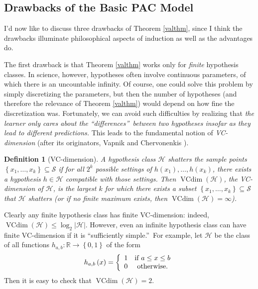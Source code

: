 \documentclass[12pt,onecolumn]{article}%
\newtheorem{definition}[theorem]{Definition}
\begin{document}
\subsection{Drawbacks of the Basic PAC Model\label{DRAWBACKS}}

I'd now like to discuss three drawbacks of Theorem \ref{valthm}, since I think
the drawbacks illuminate philosophical aspects of induction as well as the
advantages do.

The first drawback is that Theorem \ref{valthm} works only for \textit{finite}
hypothesis classes. In science, however, hypotheses often involve continuous
parameters, of which there is an uncountable infinity. Of course, one could
solve this problem by simply discretizing the parameters, but then the number
of hypotheses (and therefore the relevance of Theorem \ref{valthm}) would
depend on how fine the discretization was. Fortunately, we can avoid such
difficulties by realizing that \textit{the learner only cares about the
\textquotedblleft differences\textquotedblright\  between two hypotheses
insofar as they lead to different predictions.} This leads to the
fundamental notion of \textit{VC-dimension} (after its originators, Vapnik and
Chervonenkis \cite{vc}).

\begin{definition}
[VC-dimension]A hypothesis class $\mathcal{H}$ shatters the sample points
$\left\{  x_{1},\ldots,x_{k}\right\}  \subseteq\mathcal{S}$ if for all
$2^{k}$ possible settings of $h\left(  x_{1}\right)  ,\ldots,h\left(
x_{k}\right)  $, there exists a hypothesis $h\in\mathcal{H}$ compatible with
those settings. Then $\operatorname*{VCdim}\left(  \mathcal{H}\right)  $,
the VC-dimension of $\mathcal{H}$, is the largest $k$ for which there exists a
subset $\left\{  x_{1},\ldots,x_{k}\right\}  \subseteq\mathcal{S}$ that
$\mathcal{H}$ shatters (or if no finite maximum exists, then
$\operatorname*{VCdim}\left(  \mathcal{H}\right)  =\infty$).
\end{definition}

Clearly any finite hypothesis class has finite VC-dimension: indeed,
$\operatorname*{VCdim}\left(  \mathcal{H}\right)  \leq\log_{2}\left\vert
\mathcal{H}\right\vert $. However, even an infinite hypothesis class can
have finite VC-dimension if it is \textquotedblleft sufficiently
simple.\textquotedblright\  For example, let $\mathcal{H}$ be the class of
all functions $h_{a,b}:\mathbb{R}\rightarrow\left\{  0,1\right\}  $ of the
form%
\[
h_{a,b}\left(  x\right)  =\left\{
\begin{array}
[c]{cc}%
1 & \text{if }a\leq x\leq b\\
0 & \text{otherwise.}%
\end{array}
\right.
\]
Then it is easy to check that $\operatorname*{VCdim}\left(  \mathcal{H}%
\right)  =2$.
\end{document}
